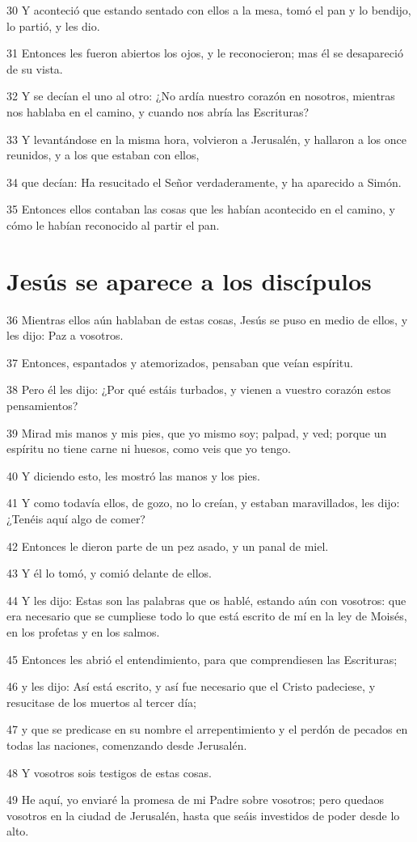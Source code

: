 \par 30 Y aconteció que estando sentado con ellos a la mesa, tomó el pan y lo bendijo, lo partió, y les dio.
\par 31 Entonces les fueron abiertos los ojos, y le reconocieron; mas él se desapareció de su vista.
\par 32 Y se decían el uno al otro: ¿No ardía nuestro corazón en nosotros, mientras nos hablaba en el camino, y cuando nos abría las Escrituras?
\par 33 Y levantándose en la misma hora, volvieron a Jerusalén, y hallaron a los once reunidos, y a los que estaban con ellos,
\par 34 que decían: Ha resucitado el Señor verdaderamente, y ha aparecido a Simón.
\par 35 Entonces ellos contaban las cosas que les habían acontecido en el camino, y cómo le habían reconocido al partir el pan.

\section*{Jesús se aparece a los discípulos}

\par 36 Mientras ellos aún hablaban de estas cosas, Jesús se puso en medio de ellos, y les dijo: Paz a vosotros.
\par 37 Entonces, espantados y atemorizados, pensaban que veían espíritu.
\par 38 Pero él les dijo: ¿Por qué estáis turbados, y vienen a vuestro corazón estos pensamientos?
\par 39 Mirad mis manos y mis pies, que yo mismo soy; palpad, y ved; porque un espíritu no tiene carne ni huesos, como veis que yo tengo.
\par 40 Y diciendo esto, les mostró las manos y los pies.
\par 41 Y como todavía ellos, de gozo, no lo creían, y estaban maravillados, les dijo: ¿Tenéis aquí algo de comer?
\par 42 Entonces le dieron parte de un pez asado, y un panal de miel.
\par 43 Y él lo tomó, y comió delante de ellos.
\par 44 Y les dijo: Estas son las palabras que os hablé, estando aún con vosotros: que era necesario que se cumpliese todo lo que está escrito de mí en la ley de Moisés, en los profetas y en los salmos.
\par 45 Entonces les abrió el entendimiento, para que comprendiesen las Escrituras;
\par 46 y les dijo: Así está escrito, y así fue necesario que el Cristo padeciese, y resucitase de los muertos al tercer día;
\par 47 y que se predicase en su nombre el arrepentimiento y el perdón de pecados en todas las naciones, comenzando desde Jerusalén.
\par 48 Y vosotros sois testigos de estas cosas.
\par 49 He aquí, yo enviaré la promesa de mi Padre sobre vosotros; pero quedaos vosotros en la ciudad de Jerusalén, hasta que seáis investidos de poder desde lo alto.

